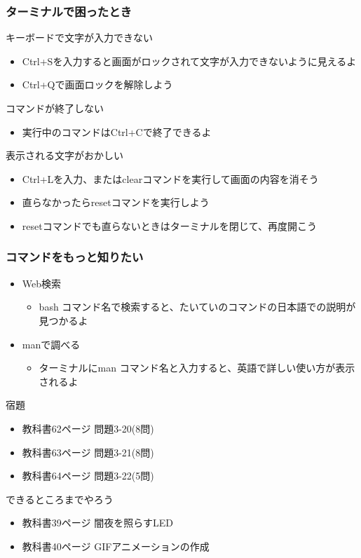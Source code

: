 \begin{frame}
    \frametitle{ターミナルで困ったとき}
    キーボードで文字が入力できない
    \begin{itemize}
        \item Ctrl+Sを入力すると画面がロックされて文字が入力できないように見えるよ
        \item Ctrl+Qで画面ロックを解除しよう
    \end{itemize}
    コマンドが終了しない
    \begin{itemize}
        \item 実行中のコマンドはCtrl+Cで終了できるよ
    \end{itemize}
    表示される文字がおかしい
    \begin{itemize}
        \item Ctrl+Lを入力、またはclearコマンドを実行して画面の内容を消そう
        \item 直らなかったらresetコマンドを実行しよう
        \item resetコマンドでも直らないときはターミナルを閉じて、再度開こう
    \end{itemize}
\end{frame}

\begin{frame}
    \frametitle{コマンドをもっと知りたい}
    \begin{itemize}
        \item Web検索
        \begin{itemize}
            \item bash コマンド名で検索すると、たいていのコマンドの日本語での説明が見つかるよ
        \end{itemize}
        \item manで調べる
        \begin{itemize}
            \item ターミナルにman コマンド名と入力すると、英語で詳しい使い方が表示されるよ
        \end{itemize}
    \end{itemize}
\end{frame}

\begin{frame}
    \begin{exampleblock}{宿題}
        \begin{itemize}
            \item 教科書62ページ 問題3-20(8問)
            \item 教科書63ページ 問題3-21(8問)
            \item 教科書64ページ 問題3-22(5問)
            \end{itemize}
    \end{exampleblock} 
    \begin{block}{できるところまでやろう}
        \begin{itemize}
            \item 教科書39ページ 闇夜を照らすLED
            \item 教科書40ページ GIFアニメーションの作成
        \end{itemize}
    \end{block} 
\end{frame}
